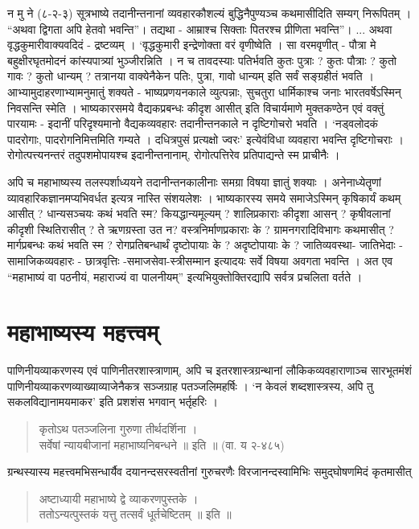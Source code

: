 {न मु ने (८-२-३) सूत्रभाष्ये तदानीन्तनानां व्यवहारकौशल्यं बुद्धिनैपुण्यञ्च कथमासीदिति सम्यग् निरूपितम् । “अथवा द्विगता अपि हेतवो भवन्ति”। तद्यथा - आम्राश्च सिक्ताः पितरश्च प्रीणिता भवन्ति”। ... अथवा वृद्धकुमारीवाक्यवदिदं - द्रष्टव्यम् । ‘वृद्धकुमारी इन्द्रेणोक्ता वरं वृणीष्वेति । सा वरमवृणीत् - पौत्रा मे बहुक्षीरघृतमोदनं कांस्यपात्र्यां भुञ्जीरन्निति । न च तावदस्याः पतिर्भवति कुतः पुत्राः ? कुतः पौत्राः ? कुतो गावः ? कुतो धान्यम् ?  तत्रानया वाक्येनैकेन पतिः, पुत्रा, गावो धान्यम् इति सर्वं सङ्ग्रहीतं भवति । आभ्यामुदाहरणाभ्यामनुमातुं शक्यते - भाष्यप्रणयनकाले व्युत्पन्नाः, सुचतुरा धार्मिकाश्च जनाः भारतवर्षेऽस्मिन् निवसन्ति स्मेति । भाष्यकारसमये वैद्यकप्रबन्धः कीदृश आसीत् इति विचार्यमाणे मुक्तकण्ठेन एवं वक्तुं पारयामः - इदानीं परिदृश्यमानो वैद्यकव्यवहारः तदानीन्तनकाले न दृष्टिगोचरो भवति । ‘नड्वलोदकं पादरोगाः, पादरोगनिमित्तमिति गम्यते । दधित्रपुसं प्रत्यक्षो ज्वरः’ इत्येवंविधा व्यवहारा भवन्ति दृष्टिगोचराः । रोगोत्पत्त्यनन्तरं तदुपशमोपायश्च इदानीन्तनानाम्, रोगोत्पत्तिरेव प्रतिपाद्यन्ते स्म प्राचीनैः ।

अपि च महाभाष्यस्य तलस्पर्शाध्ययने तदानीन्तनकालीनाः समग्रा विषया ज्ञातुं शक्याः । अनेनाध्येतॄणां व्यावहारिकज्ञानमप्यभिवर्धत इत्यत्र नास्ति संशयलेशः । भाष्यकारस्य समये समाजेऽस्मिन् कृषिकार्यं कथम् आसीत् ? धान्यसञ्चयः कथं भवति स्म? कियद्धान्यमूल्यम् ? शालिप्रकाराः कीदृशा आसन् ? कृषीवलानां कीदृशी स्थितिरासीत् ? ते ऋणग्रस्ता उत न? वस्त्रनिर्माणप्रकाराः के ? ग्रामनगरादिविभागः कथमासीत् ? मार्गप्रबन्धः कथं भवति स्म ? रोगप्रतिबन्धार्थं दृष्टोपायाः के ? अदृष्टोपायाः के ? जातिव्यवस्था- जातिभेदाः - सामाजिकव्यवहारः - छात्रवृत्तिः -समाजसेवा-स्त्रीसम्मान इत्यादयः सर्वे विषया अवगता भवन्ति । अत एव “महाभाष्यं वा पठनीयं, महाराज्यं वा पालनीयम्” इत्यभियुक्तोक्तिरद्यापि सर्वत्र प्रचलिता वर्तते ।

\section*{महाभाष्यस्य महत्त्वम्}

पाणिनीयव्याकरणस्य एवं पाणिनीतरशास्त्राणाम्, अपि च इतरशास्त्रग्रन्थानां लौकिकव्यवहाराणाञ्च सारभूतमंशं पाणिनीयव्याकरणव्याख्याव्याजेनैकत्र सञ्जग्राह पतञ्जलिमहर्षिः । ‘न केवलं शब्दशास्त्रस्य, अपि तु सकलविद्यानामयमाकर’ इति प्रशशंस भगवान् भर्तृहरिः ।
\begin{verse}
कृतोऽथ पतञ्जलिना गुरुणा तीर्थदर्शिना ।\\
सर्वेषां न्यायबीजानां महाभाष्यनिबन्धने ॥ इति ॥ (वा. य २-४८५)
\end{verse}
ग्रन्थस्यास्य महत्त्वमभिसन्धार्यैव दयानन्दसरस्वतीनां गुरुचरणैः विरजानन्दस्वामिभिः समुद्घोषणमिदं कृतमासीत् 
\begin{verse}
अष्टाध्यायी महाभाष्ये द्वे व्याकरणपुस्तके ।\\
ततोऽन्यत्पुस्तकं यत्तु तत्सर्वं धूर्तचेष्टितम् ॥ इति ॥
\end{verse}

}
